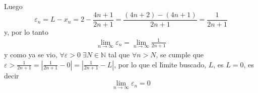 \begin{solucion}
\begin{enumerate}[(a)]
  Luego
  \begin{equation*}
   \varepsilon_n = L-x_n = 2 - \frac{4n+1}{2n+1} = \frac{(4n+2)-(4n+1)}{2n+1} = \frac{1}{2n+1}
  \end{equation*}
  y, por lo tanto
  \begin{eqnarray*}
   \lim_{n\to\infty} \varepsilon_n = \lim_{n\to \infty} \frac{1}{2n+1}
  \end{eqnarray*}
  y como ya se vio, $\forall \varepsilon > 0 \; \exists N \in \mathbb{N}$ tal que $\forall n > N$, se cumple que $\varepsilon > \frac{1}{2n+1} = \left\lvert \frac{1}{2n+1} - 0 \right\rvert = \left\lvert \frac{1}{2n+1} - L \right\rvert$, por lo que el l\'{\i}mite buscado, $L$, es $L = 0$, es decir
  \begin{equation*}
   \lim_{n\to\infty} \varepsilon_n = 0
  \end{equation*}


\end{enumerate}
\end{solucion}

